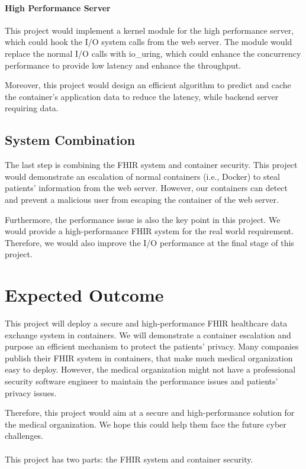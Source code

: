 \documentclass[12pt,a4paper]{article}
\begin{document}
\paragraph{High Performance Server}
This project would implement a kernel module for the high performance server, which could hook
the I/O system calls from the web server. The module would replace the normal I/O calls with
io\_uring, which could enhance the concurrency performance to provide low latency and enhance
the throughput.

Moreover, this project would design an efficient algorithm to predict and cache the container's
application data to reduce the latency, while backend server requiring data.

\subsection{System Combination}
The last step is combining the FHIR system and container security. This project would demonstrate
an escalation of normal containers (i.e., Docker) to steal patients' information from the web server.
However, our containers can detect and prevent a malicious user from escaping the container of the
web server.

Furthermore, the performance issue is also the key point in this project. We would provide a
high-performance FHIR system for the real world requirement. Therefore, we would also improve the
I/O performance at the final stage of this project.


\section{Expected Outcome}
This project will deploy a secure and high-performance FHIR healthcare data exchange system
in containers. We will demonstrate a container escalation and purpose an efficient mechanism
to protect the patients' privacy. Many companies publish their FHIR system in containers,
that make much medical organization easy to deploy. However, the medical organization might
not have a professional security software engineer to maintain the performance issues and
patients' privacy issues.

Therefore, this project would aim at a secure and high-performance solution for the medical
organization. We hope this could help them face the future cyber challenges.
\paragraph{}
This project has two parts: the FHIR system and container security.
\end{document}
